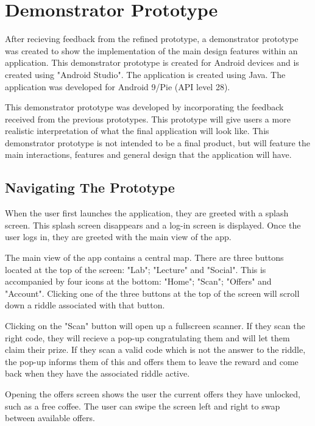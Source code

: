 \documentclass[10pt,twocolumn]{article} %
\begin{document}
\section*{Demonstrator Prototype}

After recieving feedback from the refined prototype, a demonstrator prototype was created to show the implementation of the main design features within an application. This demonstrator prototype is created for Android devices and is created using "Android Studio". The application is created using Java. The application was developed for Android 9/Pie (API level 28).

This demonstrator prototype was developed by incorporating the feedback received from the previous prototypes. This prototype will give users a more realistic interpretation of what the final application will look like. This demonstrator prototype is not intended to be a final product, but will feature the main interactions, features and general design that the application will have.

\subsection*{Navigating The Prototype}
When the user first launches the application, they are greeted with a splash screen. This splash screen disappears and a log-in screen is displayed. Once the user logs in, they are greeted with the main view of the app.

The main view of the app contains a central map. There are three buttons located at the top of the screen: "Lab"; "Lecture" and "Social". This is accompanied by four icons at the bottom: "Home";  "Scan"; "Offers" and "Account". Clicking one of the three buttons at the top of the screen will scroll down a riddle associated with that button.

Clicking on the "Scan" button will open up a fullscreen scanner. If they scan the right code, they will recieve a pop-up congratulating them and will let them claim their prize. If they scan a valid code which is not the answer to the riddle, the pop-up informs them of this and offers them to leave the reward and come back when they have the associated riddle active.

Opening the offers screen shows the user the current offers they have unlocked, such as a free coffee. The user can swipe the screen left and right to swap between available offers.
\end{document}
